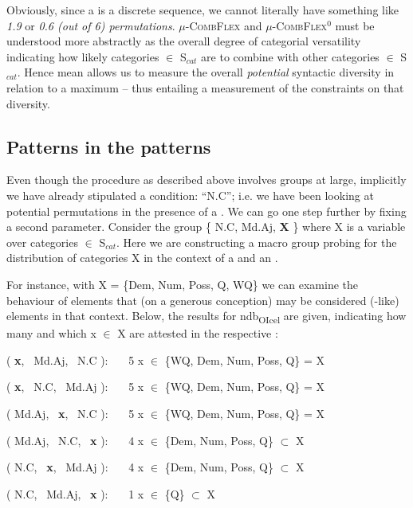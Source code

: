 \documentclass[output=paper,colorlinks,citecolor=brown,draft]{langscibook}
\begin{document}
Obviously, since a  is a discrete sequence, we cannot literally have something like \textit{1.9} or  \textit{0.6 (out of 6) permutations}. $\mu$-\textsc{CombFlex} and $\mu$-\textsc{CombFlex$^0$} must be understood more abstractly as the overall degree of categorial versatility indicating how likely categories $\in$ S$_{cat}$ are to combine with other categories $\in$ S$_{cat}$. Hence mean  allows us to measure the overall \textit{potential} syntactic diversity in relation to a maximum  -- thus entailing a measurement of the constraints on that diversity.



\subsection{Patterns in the patterns}

Even though the procedure as described above involves  groups at large, implicitly we have already stipulated a condition:  ``N.C''; i.e. we have been looking at potential permutations in the presence of a . We can go one step further by fixing a second parameter. Consider the  group  \{ N.C, Md.Aj, \textbf{ X }\} where X is a variable over categories $\in$ S$_{cat}$. Here we are constructing a macro  group probing for the distribution of categories X in the context of a  and an . 

For instance, with  X = \{Dem, Num, Poss, Q, WQ\} we can examine the behaviour of elements that (on a generous conception) may be considered (-like) elements in that context. Below, the results for ndb\textsubscript{OIcel} are given, indicating how many and which x $\in$ X are attested in the respective :

\begin{exe}
  \ex \label{macroCombF}
     \begin{xlist}

        \ex \label{macroCombFa} ( \textbf{x}, \ Md.Aj,  \ N.C  ): \ \ \  	5	\hfill x $\in$ \{WQ, Dem, Num, Poss, Q\}  = X
        
        \ex \label{macroCombFb} ( \textbf{x}, \ N.C, \ Md.Aj ): \ \ \   5 \hfill x $\in$  \{WQ, Dem, Num, Poss, Q\} = X

        \ex \label{macroCombFc} (  Md.Aj, \ \textbf{x}, \ N.C  ): \ \ \  	5	\hfill x $\in$  \{WQ, Dem, Num, Poss, Q\} = X
        
        \ex \label{macroCombFd} ( Md.Aj, \ N.C, \ \textbf{x} ): \ \ \	4 \hfill x $\in$ \{Dem, Num, Poss, Q\}	$\subset$ X
        
        \ex \label{macroCombFe} (  N.C, \ \textbf{x}, \ Md.Aj ): \ \ \	 4	\hfill x $\in$ \{Dem, Num, Poss, Q\}  $\subset$ X 
        
        \ex \label{macroCombFf} ( N.C, \ Md.Aj, \ \textbf{x} ): \ \ \ 1 \hfill x $\in$ \{Q\} $\subset$ X 
        
     \end{xlist}
\end{exe} 
\end{document}
